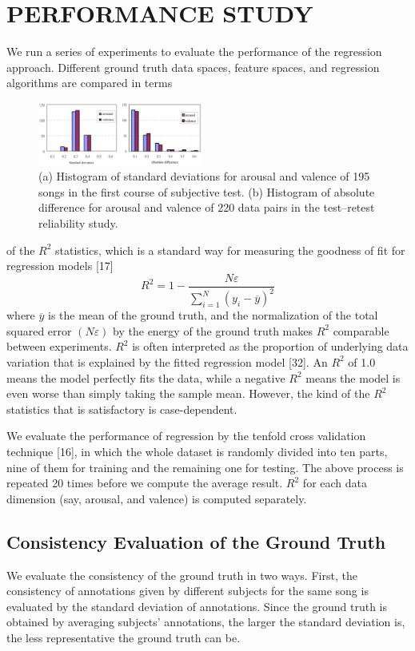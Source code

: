 \documentclass[journal, twoside]{IEEEtran}
\begin{document}
\section{PERFORMANCE STUDY}
We run a series of experiments to evaluate the performance of the regression approach. Different ground truth data spaces, feature spaces, and regression algorithms are compared in terms
\begin{figure}[h]
\centering
\captionsetup{justification=centering}
\includegraphics[width=0.48\textwidth, height=0.18\textwidth]{fig3.png}
\caption{(a) Histogram of standard deviations for arousal and valence of 195
songs in the first course of subjective test. (b) Histogram of absolute difference
for arousal and valence of 220 data pairs in the test–retest reliability study.}
\label{fig3}
\end{figure}
of the \(R^2\) statistics, which is a standard way for measuring the
goodness of fit for regression models [17]
\begin{equation}
R^2 = 1 - \frac{N \varepsilon}{ \sum_{i=1}^N (y_i - \overline{y})^2}
\end{equation}
where \(\overline{y}\) is the mean of the ground truth, and the normalization of the total squared error \((N \varepsilon)\) by the energy of the ground truth makes \(R^2\) comparable between experiments. \(R^2\) is often interpreted as the proportion of underlying data variation that is explained by the fitted regression model [32]. An \(R^2\) of 1.0 means the model perfectly fits the data, while a negative \(R^2\) means the model is even worse than simply taking the sample mean. However, the kind of the \(R^2\) statistics that is satisfactory is case-dependent.

We evaluate the performance of regression by the tenfold cross validation technique [16], in which the whole dataset is randomly divided into ten parts, nine of them for training and the remaining one for testing. The above process is repeated 20 times before we compute the average result. \(R^2\) for each data dimension (say, arousal, and valence) is computed separately.

\subsection{Consistency Evaluation of the Ground Truth}
We evaluate the consistency of the ground truth in two ways. First, the consistency of annotations given by different subjects for the same song is evaluated by the standard deviation of annotations. Since the ground truth is obtained by averaging subjects’ annotations, the larger the standard deviation is, the less representative the ground truth can be.
\end{document}
